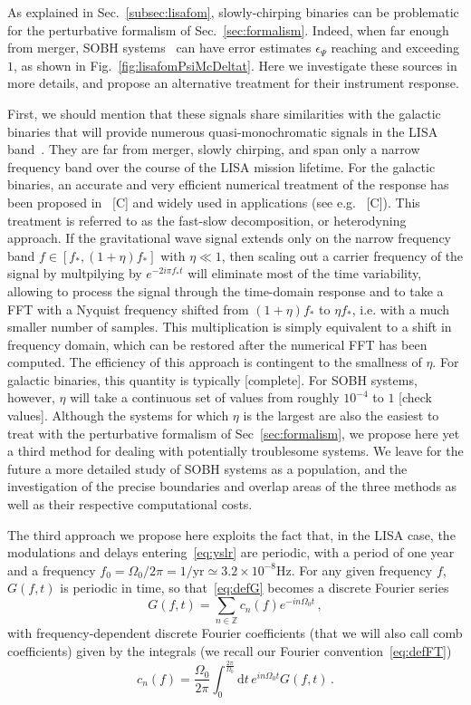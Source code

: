 \documentclass[aps,showpacs,twocolumn,
prd,superscriptaddress,nofootinbib]{revtex4-1}
\newcommand{\be}{\begin{equation}}
\newcommand{\ee}{\end{equation}}
\newcommand\ud{{\mathrm{d}}}
\newcommand{\SM}[1]{{\color{Red} #1}}
\begin{document}
As explained in Sec.~\ref{subsec:lisafom}, slowly-chirping binaries can be problematic for the perturbative formalism of Sec.~\ref{sec:formalism}. Indeed, when far enough from merger, SOBH systems~\cite{Sesana16} can have error estimates $\epsilon_{\Psi}$ reaching and exceeding $1$, as shown in Fig.~\ref{fig:lisafomPsiMcDeltat}. Here we investigate these sources in more details, and propose an alternative treatment for their instrument response.

First, we should mention that these signals share similarities with the galactic binaries that will provide numerous quasi-monochromatic signals in the LISA band~\cite{LISA17}. They are far from merger, slowly chirping, and span only a narrow frequency band over the course of the LISA mission lifetime. For the galactic binaries, an accurate and very efficient numerical treatment of the response has been proposed in~\cite{} \SM{[C]} and widely used in applications (see e.g.~\cite{} \SM{[C]}). This treatment is referred to as the fast-slow decomposition, or heterodyning approach. If the gravitational wave signal extends only on the narrow frequency band $f \in [f_{*}, (1+\eta) f_{*}]$ with $\eta \ll 1$, then scaling out a carrier frequency of the signal by multpilying by $e^{-2 i \pi f_{*} t}$ will eliminate most of the time variability, allowing to process the signal through the time-domain response and to take a FFT with a Nyquist frequency shifted from $(1+\eta) f_{*}$ to $\eta f_{*}$, i.e. with a much smaller number of samples. This multiplication is simply equivalent to a shift in frequency domain, which can be restored after the numerical FFT has been computed. The efficiency of this approach is contingent to the smallness of $\eta$. For galactic binaries, this quantity is typically \SM{[complete]}. For SOBH systems, however, $\eta$ will take a continuous set of values from roughly $10^{-4}$ to $1$ \SM{[check values]}. Although the systems for which $\eta$ is the largest are also the easiest to treat with the perturbative formalism of Sec~\ref{sec:formalism}, we propose here yet a third method for dealing with potentially troublesome systems. We leave for the future a more detailed study of SOBH systems as a population, and the investigation of the precise boundaries and overlap areas of the three methods as well as their respective computational costs.

The third approach we propose here exploits the fact that, in the LISA case, the modulations and delays entering~\eqref{eq:yslr} are periodic, with a period of one year and a frequency $f_{0} = \Omega_{0}/2\pi = 1/\mathrm{yr} \simeq 3.2\times 10^{-8}\mathrm{Hz}$. For any given frequency $f$, $G(f,t)$ is periodic in time, so that~\eqref{eq:defG} becomes a discrete Fourier series
\be\label{eq:Gdiscretefourier}
	G(f,t) = \sum_{n \in \mathbb{Z}} c_{n}(f) e^{-in\Omega_{0}t} \,,
\ee
with frequency-dependent discrete Fourier coefficients (that we will also call comb coefficients) given by the integrals (we recall our Fourier convention~\eqref{eq:defFT})
\be\label{eq:defcn}
	c_{n}(f) = \frac{\Omega_{0}}{2\pi} \int_{0}^{\frac{2\pi}{\Omega_{0}}} \ud t \, e^{i n \Omega_{0} t} G(f,t) \,.
\ee
\end{document}

